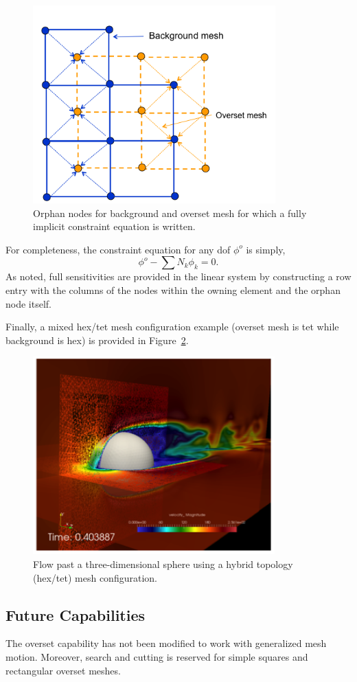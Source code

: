 \begin{figure} [h]
\centerline{\includegraphics[height=3.0in]{images/oversetNodes}}
\vspace{0.1in}
\caption{Orphan nodes for background and overset mesh for which a fully 
implicit constraint equation is written.}
\label{orphanNodes}
\end{figure}

For completeness, the constraint equation for any dof $\phi^o$ is simply,
\begin{equation}
  \phi^o - \sum N_k \phi_k = 0.
\label{constraint}
\end{equation}
As noted, full sensitivities are provided in the linear system by constructing
a row entry with the columns of the nodes within the owning element and the
orphan node itself.

Finally, a mixed hex/tet mesh configuration example (overset mesh is tet 
while background is hex) is provided in Figure~\ref{oversetSphere}.

\begin{figure} [h]
\centerline{\includegraphics[height=3.0in]{images/oversetSphere}}
\vspace{0.1in}
\caption{Flow past a three-dimensional sphere using a hybrid topology 
(hex/tet) mesh configuration.}
\label{oversetSphere}
\end{figure}

\subsection{Future Capabilities}

The overset capability has not been modified to work with generalized mesh
motion. Moreover, search and cutting is reserved for simple squares and 
rectangular overset meshes.


